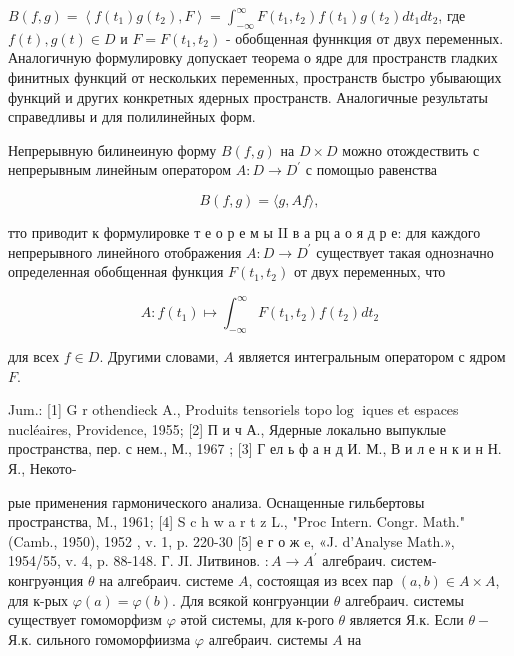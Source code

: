 \documentclass[10pt]{article}
\begin{document}
$B(f, g)=\left\langle f\left(t_{1}\right) g\left(t_{2}\right), F\right\rangle=\int_{-\infty}^{\infty} F\left(t_{1}, t_{2}\right) f\left(t_{1}\right) g\left(t_{2}\right) d t_{1} d t_{2}$, где $f(t), g(t) \in D$ и $F=F\left(t_{1}, t_{2}\right)$ - обобщенная фуннкция от двух переменных. Аналогичную формулировку допускает теорема о ядре для пространств гладких финитных функций от нескольких переменных, пространств быстро убывающих функций и других конкретных ядерных пространств. Аналогичные результаты справедливы и для полилинейных форм.



Непрерывную билинеиную форму $B(f, g)$ на $D \times D$ можно отождествить с непрерывным линейным оператором $A: D \rightarrow D^{\prime}$ с помощыо равенства



\[

B(f, g)=\langle g, A f\rangle,

\]



тто приводит к формулировке т е о р е м ы II в а рц а о я д р е: для каждого непрерывного линейного отображения $A: D \rightarrow D^{\prime}$ существует такая однозначно определенная обобщенная функция $F\left(t_{1}, t_{2}\right)$ от двух переменных, что



\[

A: f\left(t_{1}\right) \mapsto \int_{-\infty}^{\infty} F\left(t_{1}, t_{2}\right) f\left(t_{2}\right) d t_{2}

\]



для всех $f \in D$. Другими словами, $A$ является интегральным оператором с ядром $F$.



Jum.: [1] G r othendieck A., Produits tensoriels topo$\log$ iques et espaces nucléaires, Providence, 1955; [2] П и ч А., Ядерные локально выпуклые пространства, пер. с нем., М., 1967 ; [3] Г ел ь ф а н д И. М., В и л е н к и н Н. Я., Некото-

рые применения гармонического анализа. Оснащенные гильбертовы пространства, M., 1961; [4] S c h w a r t z L., "Proc Intern. Congr. Math." (Camb., 1950), 1952 , v. 1, p. 220-30 [5] е г о ж e, «J. d'Analyse Math.», 1954/55, v. 4, p. 88-148. Г. ЈI. ЈІитвинов. $: A \rightarrow A^{\prime}$ алгебраич. систем- конгруәнция $\theta$ на алгебраич. системе $A$, состоящая из всех пар $(a, b) \in A \times A$, для к-рых $\varphi(a)=\varphi(b)$. Для всякой конгруәнции $\theta$ алгебраич. системы существует гомоморфизм $\varphi$ әтой системы, для к-рого $\theta$ является Я.к. Если $\theta-$ Я.к. сильного гомоморфиизма $\varphi$ алгебраич. системы $A$ на
\end{document}
